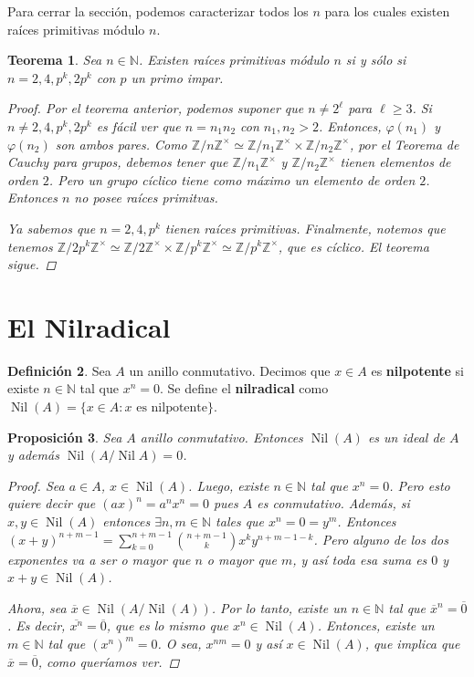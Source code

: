 \documentclass[12pt]{book}
\newtheorem{teo}{Teorema}[section]
\newtheorem{prop}[teo]{Proposición}
\theoremstyle{definition}
\newtheorem{defn}[teo]{Definición}
\newcommand{\ZZ}{\mathbb{Z}}      %
\newcommand{\NN}{\mathbb{N}}
\DeclareMathOperator{\Nil}{Nil}
\begin{document}
Para cerrar la sección, podemos caracterizar todos los $n$ para los cuales existen raíces primitivas módulo $n$.

\begin{teo}
Sea $n\in\NN$. Existen raíces primitivas módulo $n$ si y sólo si $n=2,4,p^k,2p^k$ con $p$ un primo impar.
\begin{proof}
Por el teorema anterior, podemos suponer que $n\neq 2^{\ell}$ para $\ell\geq 3$. Si $n\neq 2,4,p^k,2p^k$ es fácil ver que $n=n_1n_2$ con $n_1,n_2>2$. Entonces, $\varphi(n_1)$ y $\varphi(n_2)$ son ambos pares. Como $\ZZ/n\ZZ^\times \simeq \ZZ/n_1\ZZ^\times \times \ZZ/n_2\ZZ^\times$, por el Teorema de Cauchy para grupos, debemos tener que $\ZZ/n_1\ZZ^\times$ y $\ZZ/n_2\ZZ^\times$ tienen elementos de orden $2$. Pero un grupo cíclico tiene como máximo un elemento de orden $2$. Entonces $n$ no posee raíces primitvas.

Ya sabemos que $n=2,4,p^k$ tienen raíces primitivas. Finalmente, notemos que tenemos $\ZZ/2p^k\ZZ^\times \simeq \ZZ/2\ZZ^\times \times \ZZ/p^k\ZZ^\times \simeq \ZZ/p^k\ZZ^\times$, que es cíclico. El teorema sigue.
\end{proof}
\end{teo}

\section{El Nilradical}

\begin{defn}
Sea $A$ un anillo conmutativo. Decimos que $x\in A$ es \textbf{nilpotente} si existe $n\in\NN$ tal que $x^n = 0$. Se define el \textbf{nilradical} como $\Nil (A) = \{x\in A : x\text{ es nilpotente}\}$.
\end{defn}

\begin{prop}
Sea $A$ anillo conmutativo. Entonces $\Nil (A)$ es un ideal de $A$ y además $\Nil(A/\Nil A) = 0$.
\begin{proof}
Sea $a\in A$, $x\in \Nil(A)$. Luego, existe $n\in\NN$ tal que $x^n=0$. Pero esto quiere decir que $(ax)^n = a^n x^n = 0$ pues $A$ es conmutativo. Además, si $x,y\in\Nil (A)$ entonces $\exists n,m\in\NN$ tales que $x^n = 0 = y^m$. Entonces $(x+y)^{n+m-1} = \displaystyle\sum_{k=0}^{n+m-1}\binom{n+m-1}{k}x^k y^{n+m-1-k}$. Pero alguno de los dos exponentes va a ser o mayor que $n$ o mayor que $m$, y así toda esa suma es $0$ y $x+y\in\Nil(A)$.

Ahora, sea $\overline{x}\in \Nil(A/\Nil(A))$. Por lo tanto, existe un $n\in\NN$ tal que $\overline{x}^n = \overline{0}$. Es decir, $\overline{x^n} = \overline{0}$, que es lo mismo que $x^n \in \Nil(A)$. Entonces, existe un $m\in\NN$ tal que $(x^n)^m = 0$. O sea, $x^{nm}=0$ y así $x\in\Nil(A)$, que implica que $\overline{x}=\overline{0}$, como queríamos ver.
\end{proof}
\end{prop}
\end{document}
